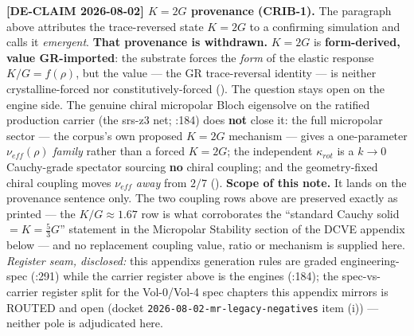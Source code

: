 \noindent\textbf{[DE-CLAIM 2026-08-02] $K = 2G$ provenance (CRIB-1).} The paragraph above attributes the trace-reversed state $K = 2G$ to a confirming simulation and calls it \emph{emergent}. \textbf{That provenance is withdrawn.} $K = 2G$ is \textbf{form-derived, value GR-imported}: the substrate forces the \emph{form} of the elastic response $K/G = f(\rho)$, but the value --- the GR trace-reversal identity --- is neither crystalline-forced nor constitutively-forced (). The question stays open on the engine side. The genuine chiral micropolar Bloch eigensolve on the ratified production carrier (the srs-z3 net; :184) does \textbf{not} close it: the full micropolar sector --- the corpus's own proposed $K = 2G$ mechanism --- gives a one-parameter $\nu_{eff}(\rho)$ \emph{family} rather than a forced $K = 2G$; the independent $\kappa_{rot}$ is a $k \to 0$ Cauchy-grade spectator sourcing \textbf{no} chiral coupling; and the geometry-fixed chiral coupling moves $\nu_{eff}$ \emph{away} from $2/7$ (). \textbf{Scope of this note.} It lands on the provenance sentence only. The two coupling rows above are preserved exactly as printed --- the $K/G \approx 1.67$ row is what corroborates the ``standard Cauchy solid $= K = \frac{5}{3}G$'' statement in the Micropolar Stability section of the DCVE appendix below --- and no replacement coupling value, ratio or mechanism is supplied here. \emph{Register seam, disclosed:} this appendix\textquotesingle s generation rules are graded engineering-spec (:291) while the carrier register above is the engine\textquotesingle s (:184); the spec-vs-carrier register split for the Vol-0/Vol-4 spec chapters this appendix mirrors is ROUTED and open (docket \texttt{2026-08-02-mr-legacy-negatives} item (i)) --- neither pole is adjudicated here.

